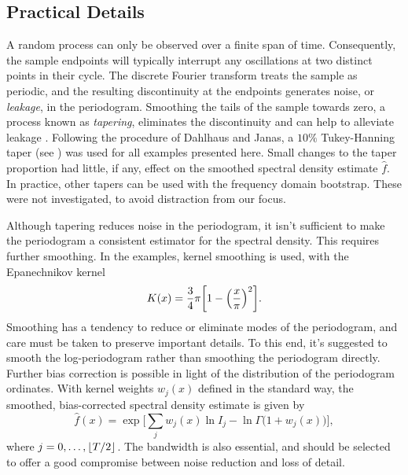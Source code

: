 \subsection*{Practical Details}
A random process can only be observed over a finite span of time.
Consequently, the sample endpoints will typically interrupt any oscillations
at two distinct points in their cycle.
The discrete Fourier transform treats the sample as periodic,
and the resulting discontinuity at the endpoints generates noise,
or \textit{leakage}, in the periodogram.
Smoothing the tails of the sample towards zero,
a process known as \textit{tapering},
eliminates the discontinuity and can help to alleviate leakage \cite{shumway}.
Following the procedure of Dahlhaus and Janas,
a $10\%$ Tukey-Hanning taper (see \cite{dahlhaus}) 
was used for all examples presented here.
Small changes to the taper proportion had little, if any,
effect on the smoothed spectral density estimate $\hat{f}$.
In practice, other tapers can be used with the frequency domain bootstrap.
These were not investigated, to avoid distraction from our focus.

Although tapering reduces noise in the periodogram,
it isn't sufficient to make the periodogram a consistent estimator for the
spectral density.
This requires further smoothing.
In the examples, kernel smoothing is used, with the Epanechnikov kernel
    \[
    K(x) 
    = 
    \frac{3}{4}\pi \biggl[ 1 - \Bigl( \frac{x}{\pi} \Bigr)^2 \biggr].
    \]
Smoothing has a tendency to reduce or eliminate modes of the periodogram,
and care must be taken to preserve important details.
To this end, it's suggested to smooth the log-periodogram rather than smoothing
the periodogram directly.
Further bias correction is possible in light of the distribution of the
periodogram ordinates.
With kernel weights $w_j(x)$ defined in the standard way,
the smoothed, bias-corrected spectral density estimate is given by
    \[
    \hat{f}(x)
    =
    \exp\biggl[
        \sum_{j} w_j(x) \ln I_{j} 
        - \ln \Gamma\bigl(1 + w_j(x)\bigr)
    \biggr],
    \]
where $j = 0, \ldots, \lfloor T / 2\rfloor$.
The bandwidth is also essential, 
and should be selected to offer a good compromise between noise reduction and
loss of detail.

